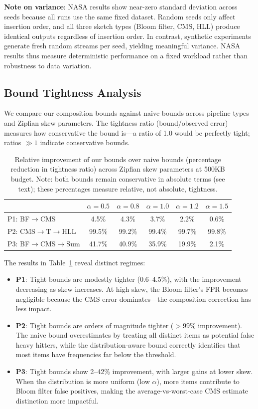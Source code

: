 \documentclass[preprint]{article}
\begin{document}
\textbf{Note on variance}: NASA results show near-zero standard deviation across seeds because all runs use the same fixed dataset. Random seeds only affect insertion order, and all three sketch types (Bloom filter, CMS, HLL) produce identical outputs regardless of insertion order. In contrast, synthetic experiments generate fresh random streams per seed, yielding meaningful variance. NASA results thus measure deterministic performance on a fixed workload rather than robustness to data variation.

\subsection{Bound Tightness Analysis}

We compare our composition bounds against naive bounds across pipeline types and Zipfian skew parameters. The tightness ratio (bound/observed error) measures how conservative the bound is---a ratio of 1.0 would be perfectly tight; ratios $\gg 1$ indicate conservative bounds.

\begin{table}[t]
\centering
\caption{Relative improvement of our bounds over naive bounds (percentage reduction in tightness ratio) across Zipfian skew parameters at 500KB budget. Note: both bounds remain conservative in absolute terms (see text); these percentages measure relative, not absolute, tightness.}
\label{tab:tightness}
\begin{tabular}{lccccc}
\toprule
 & $\alpha=0.5$ & $\alpha=0.8$ & $\alpha=1.0$ & $\alpha=1.2$ & $\alpha=1.5$ \\
\midrule
P1: BF$\to$CMS       & 4.5\% & 4.3\% & 3.7\% & 2.2\% & 0.6\% \\
P2: CMS$\to$T$\to$HLL & 99.5\% & 99.2\% & 99.4\% & 99.7\% & 99.8\% \\
P3: BF$\to$CMS$\to$Sum & 41.7\% & 40.9\% & 35.9\% & 19.9\% & 2.1\% \\
\bottomrule
\end{tabular}
\end{table}

The results in Table~\ref{tab:tightness} reveal distinct regimes:
\begin{itemize}
    \item \textbf{P1}: Tight bounds are modestly tighter (0.6--4.5\%), with the improvement decreasing as skew increases. At high skew, the Bloom filter's FPR becomes negligible because the CMS error dominates---the composition correction has less impact.
    \item \textbf{P2}: Tight bounds are orders of magnitude tighter ($>99\%$ improvement). The naive bound overestimates by treating all distinct items as potential false heavy hitters, while the distribution-aware bound correctly identifies that most items have frequencies far below the threshold.
    \item \textbf{P3}: Tight bounds show 2--42\% improvement, with larger gains at lower skew. When the distribution is more uniform (low $\alpha$), more items contribute to Bloom filter false positives, making the average-vs-worst-case CMS estimate distinction more impactful.
\end{itemize}
\end{document}

